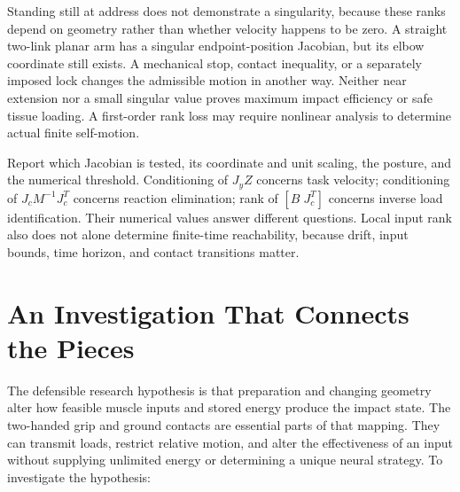 Standing still at address does not demonstrate a singularity, because these
ranks depend on geometry rather than whether velocity happens to be zero. A
straight two-link planar arm has a singular endpoint-position Jacobian, but its
elbow coordinate still exists. A mechanical stop, contact inequality, or a
separately imposed lock changes the admissible motion in another way. Neither
near extension nor a small singular value proves maximum impact efficiency or
safe tissue loading. A first-order rank loss may require nonlinear analysis to
determine actual finite self-motion.

Report which Jacobian is tested, its coordinate and unit scaling, the posture,
and the numerical threshold. Conditioning of $J_yZ$ concerns task velocity;
conditioning of $J_cM^{-1}J_c^T$ concerns reaction elimination; rank of
$[B\;J_c^T]$ concerns inverse load identification. Their numerical values answer
different questions. Local input rank also does not alone determine finite-time
reachability, because drift, input bounds, time horizon, and contact transitions
matter.

\section{An Investigation That Connects the Pieces}
\label{sec:synthesis_golfer}

The defensible research hypothesis is that preparation and changing geometry
alter how feasible muscle inputs and stored energy produce the impact state.
The two-handed grip and ground contacts are essential parts of that mapping.
They can transmit loads, restrict relative motion, and alter the effectiveness
of an input without supplying unlimited energy or determining a unique neural
strategy. To investigate the hypothesis:

